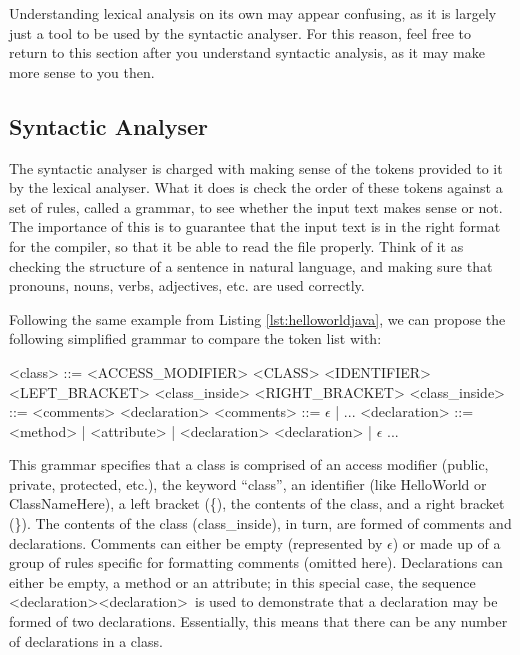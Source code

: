 Understanding lexical analysis on its own may appear confusing, as it is largely just a tool to be used by the syntactic analyser. For this reason, feel free to return to this section after you understand syntactic analysis, as it may make more sense to you then.


\subsection{Syntactic Analyser}

The syntactic analyser is charged with making sense of the tokens provided to it by the lexical analyser. What it does is check the order of these tokens against a set of rules, called a grammar, to see whether the input text makes sense or not. The importance of this is to guarantee that the input text is in the right format for the compiler, so that it be able to read the file properly. Think of it as checking the structure of a sentence in natural language, and making sure that pronouns, nouns, verbs, adjectives, etc. are used correctly.

Following the same example from Listing \ref{lst:helloworldjava}, we can propose the following simplified grammar to compare the token list with:

\begin{listing}
\begin{grammar}
<class> ::= <ACCESS_MODIFIER> <CLASS> <IDENTIFIER> <LEFT_BRACKET> <class_inside> <RIGHT_BRACKET>
\alt<class_inside> ::= <comments> <declaration>
\alt<comments> ::= $\epsilon$ | ...
\alt<declaration> ::= <method> | <attribute> | <declaration> <declaration> | $\epsilon$
\alt...
\end{grammar}
\end{listing}

This grammar specifies that a class is comprised of an access modifier (public, private, protected, etc.), the keyword ``class'', an identifier (like HelloWorld or ClassNameHere), a left bracket (\{), the contents of the class, and a right bracket (\}). The contents of the class (class_inside), in turn, are formed of comments and declarations. Comments can either be empty (represented by $\epsilon$) or made up of a group of rules specific for formatting comments (omitted here). Declarations can either be empty, a method or an attribute; in this special case, the sequence \textless declaration\textgreater  \textless declaration\textgreater \ is used to demonstrate that a declaration may be formed of two declarations. Essentially, this means that there can be any number of declarations in a class.

